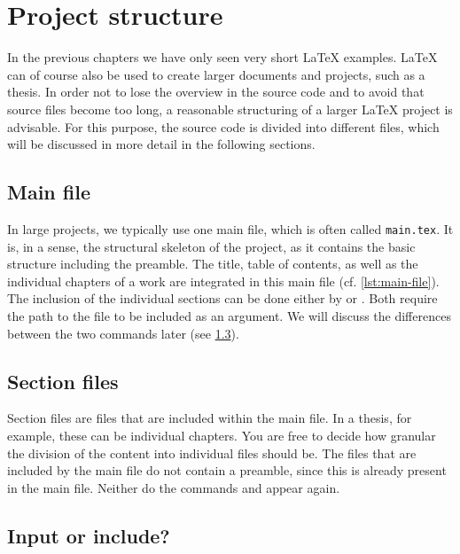 \chapter{Project structure}
\label{sec:project-structure}

In the previous chapters we have only seen very short \LaTeX{} examples. \LaTeX{} can of course also be used to create larger documents and projects, such as a thesis. 
In order not to lose the overview in the source code and to avoid that source files become too long, a reasonable structuring of a larger \LaTeX{} project is advisable. For this purpose, the source code is divided into different files, which will be discussed in more detail in the following sections.

\section{Main file}

In large projects, we typically use one main file, which is often called \texttt{main.tex}. It is, in a sense, the structural skeleton of the project, as it contains the basic structure including the preamble. The title, table of contents, as well as the individual chapters of a work are integrated in this main file (cf. \cref{lst:main-file}). The inclusion of the individual sections can be done either by \texttt{} or \texttt{}. Both require the path to the file to be included as an argument. We will discuss the differences between the two commands later (see \cref{sec:input-vs-include}).


\section{Section files}
Section files are files that are included within the main file. In a thesis, for example, these can be individual chapters. You are free to decide how granular the division of the content into individual files should be.
The files that are included by the main file do not contain a preamble, since this is already present in the main file. Neither do the commands \texttt{} and \texttt{} appear again.

\section{Input or include?}
\label{sec:input-vs-include}

